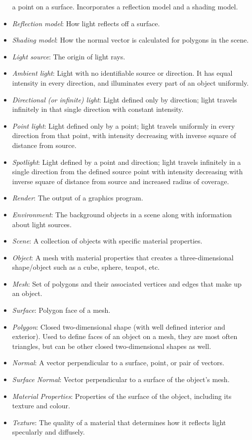 \documentclass[12pt]{article}
\begin{document}
\begin{itemize}
a point on a surface. Incorporates a reflection model and a shading model. 
\item[\label{}] \textit{Reflection model}: How light reflects off a surface. 
\item[\label{}] \textit{Shading model}: How the normal vector is calculated for 
polygons in the scene.
\item[\label{}] \textit{Light source}: The origin of light rays.
\item[\label{}] \textit{Ambient light}: Light with no identifiable source or 
direction. It has equal intensity in every direction, and illuminates every 
part of an object uniformly.
\item[\label{}] \textit{Directional (or infinite) light}: Light defined only by 
direction; light travels infinitely in that single direction with constant 
intensity. 
\item[\label{}] \textit{Point light}: Light defined only by a point; light 
travels uniformly in every direction from that point, with intensity decreasing 
with inverse square of distance from source. 
\item[\label{}] \textit{Spotlight}: Light defined by a point and direction; 
light travels infinitely in a single direction from the defined source point 
with intensity decreasing with inverse square of distance from source and 
increased radius of coverage.
\item[\label{}] \textit{Render}: The output of a graphics program.
\item[\label{}] \textit{Environment}: The background objects in a scene along 
with information about light sources.
\item[\label{}] \textit{Scene}: A collection of objects with specific material 
properties. 
\item[\label{}] \textit{Object}: A mesh with material properties that creates a 
three-dimensional shape/object such as a cube, sphere, teapot, etc.
\item[\label{}] \textit{Mesh}: Set of polygons and their associated vertices 
and edges that make up an object.
\item[\label{}]\textit{Surface}: Polygon face of a mesh. 
\item[\label{}] \textit{Polygon}: Closed two-dimensional shape (with well 
defined interior and exterior). Used to define faces of an object on a mesh, 
they are most often triangles, but can be other closed two-dimensional shapes 
as well.
\item[\label{}] \textit{Normal}: A vector perpendicular to a surface, point, or 
pair of vectors.
\item[\label{}]\textit{Surface Normal}: Vector perpendicular to a surface of 
the object's mesh.
\item[\label{} ]\textit{Material Properties}: Properties of the surface of the 
object, including its texture and colour.
\item[\label{}]\textit{Texture}: The quality of a material that determines how 
it reflects light specularly and diffusely.



\end{itemize}
\end{document}
